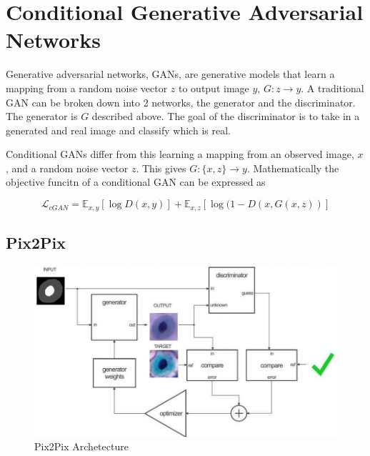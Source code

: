 \documentclass[ms,electronic,oneside,twosidetoc,letterpaper,chaptercenter,parttop]{byumsphd}
\begin{document}
\section{Conditional Generative Adversarial Networks}

Generative adversarial networks, GANs, are generative models that learn a mapping from 
a random noise vector $z$ to output image $y$, $G : z \rightarrow y$. A traditional GAN
can be broken down into 2 networks, the generator and the discriminator. The generator is $G$ 
described above. The goal of the discriminator is to take in a generated and real image and 
classify which is real.

Conditional GANs differ from this learning a mapping from an observed image, $x$, and a random noise vector $z$. This 
gives $G: \{ x, z \} \rightarrow y$. Mathematically the objective funcitn of a conditional GAN can be expressed as

$$\mathcal{L}_{cGAN} = \mathbb{E}_{x,y}[\log D(x,y)] + \mathbb{E}_{x,z}[\log (1 - D(x, G(x, z))]$$

\subsection{Pix2Pix}

\begin{figure}[H]
  \centering
  \includegraphics[width=.9\textwidth]{pix2pix}
  \caption{Pix2Pix Archetecture \cite{pix2pix-image}}
\end{figure}
\end{document}
